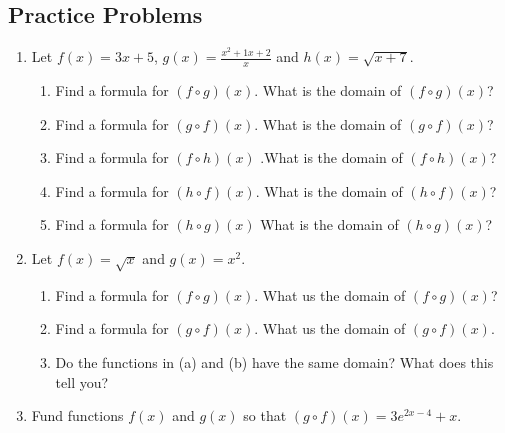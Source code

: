 \documentclass[11pt]{book}               %
\begin{document}
\subsection{Practice Problems}
\begin{enumerate}
\item Let $f(x)=3x+5$, $g(x) = \frac{x^2+1x+2}{x}$ and $h(x)=\sqrt{x+7}$.
\begin{enumerate}
 \item Find a formula for $(f\circ g)(x)$.  What is the domain of $(f\circ g)(x)$?
 \item Find a formula for $(g\circ f)(x)$. What is the domain of $(g\circ f)(x)$?
\item Find a formula for $(f\circ h)(x)$ .What is the domain of $(f\circ h)(x)$?
\item Find a formula for $(h\circ f)(x)$. What is the domain of $(h\circ f)(x)$?
\item  Find a formula for $(h\circ g)(x)$ What is the domain of $(h\circ g)(x)$?
\end{enumerate}
%
%
\item Let $f(x)=\sqrt{x}$ and $g(x)=x^2$.
\begin{enumerate}
\item Find a formula for $(f\circ g)(x)$.  What us the domain of $(f\circ g)(x)$?
\item Find a formula for $(g\circ f)(x)$.  What us the domain of $(g\circ f)(x)$.
\item  Do the functions in (a) and (b) have the same domain? What does this tell you?
\end{enumerate}

\item Fund functions $f(x)$ and $g(x)$ so that $(g \circ f)(x) = 3e^{2x-4} + x$.
\end{enumerate}
\end{document}
